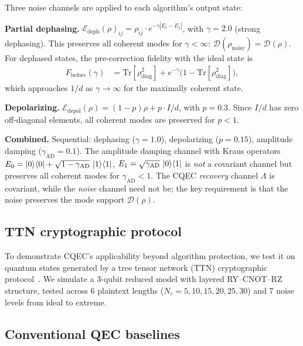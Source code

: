 \documentclass[prx,twocolumn,superscriptaddress,longbibliography,floatfix]{revtex4-2}
\begin{document}
Three noise channels are applied to each algorithm's output state:

\textbf{Partial dephasing.}
$\mathcal{E}_\mathrm{deph}(\rho)_{ij} = \rho_{ij} \cdot e^{-\gamma|E_i - E_j|}$, with $\gamma = 2.0$ (strong dephasing).
This preserves all coherent modes for $\gamma < \infty$: $\mathcal{D}(\rho_\mathrm{noisy}) = \mathcal{D}(\rho)$.
For dephased states, the pre-correction fidelity with the ideal state is
\begin{align}
F_\mathrm{before}(\gamma) &= \mathrm{Tr}[\rho_\mathrm{diag}^2] + e^{-\gamma}\bigl(1 - \mathrm{Tr}[\rho_\mathrm{diag}^2]\bigr),
\label{eq:fidelity_decay}
\end{align}
which approaches $1/d$ as $\gamma \to \infty$ for the maximally coherent state.

\textbf{Depolarizing.}
$\mathcal{E}_\mathrm{depol}(\rho) = (1-p)\rho + p \cdot I/d$, with $p = 0.3$.
Since $I/d$ has zero off-diagonal elements, all coherent modes are preserved for $p < 1$.

\textbf{Combined.}
Sequential: dephasing ($\gamma = 1.0$), depolarizing ($p = 0.15$), amplitude damping ($\gamma_\mathrm{AD} = 0.1$).
The amplitude damping channel with Kraus operators $E_0 = \ket{0}\!\bra{0} + \sqrt{1-\gamma_\mathrm{AD}}\,\ket{1}\!\bra{1}$, $E_1 = \sqrt{\gamma_\mathrm{AD}}\,\ket{0}\!\bra{1}$ is \emph{not} a covariant channel but preserves all coherent modes for $\gamma_\mathrm{AD} < 1$.
The CQEC \emph{recovery} channel $\Lambda$ is covariant, while the \emph{noise} channel need not be; the key requirement is that the noise preserves the mode support $\mathcal{D}(\rho)$.


\subsection{TTN cryptographic protocol}
\label{sec:ttn}

To demonstrate CQEC's applicability beyond algorithm protection, we test it on quantum states generated by a tree tensor network (TTN) cryptographic protocol~\cite{Huggins2019,Sim2019}.
We simulate a 3-qubit reduced model with layered RY--CNOT--RZ structure, tested across 6 plaintext lengths ($N_c = 5, 10, 15, 20, 25, 30$) and 7 noise levels from ideal to extreme.


\subsection{Conventional QEC baselines}
\label{sec:qec_baselines}
\end{document}
